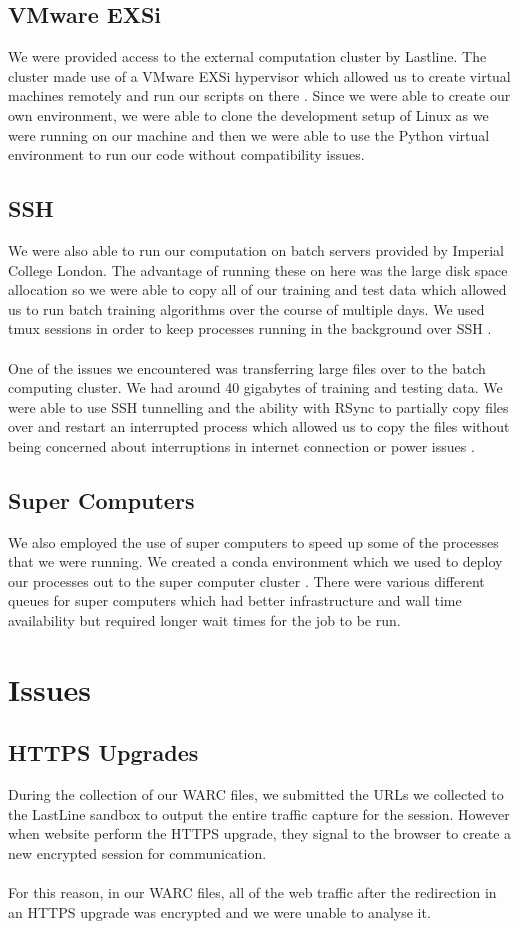 \documentclass[12pt,twoside]{report}
\begin{document}
\subsection{VMware EXSi}
We were provided access to the external computation cluster by Lastline. The cluster made use of a VMware EXSi hypervisor which allowed us to create virtual machines remotely and run our scripts on there \cite{vmwareexsi}. Since we were able to create our own environment, we were able to clone the development setup of Linux as we were running on our machine and then we were able to use the Python virtual environment to run our code without compatibility issues.
\subsection{SSH}
We were also able to run our computation on batch servers provided by Imperial College London. The advantage of running these on here was the large disk space allocation so we were able to copy all of our training and test data which allowed us to run batch training algorithms over the course of multiple days. We used tmux sessions in order to keep processes running in the background over SSH \cite{tmux}.
\\\\
One of the issues we encountered was transferring large files over to the batch computing cluster. We had around 40 gigabytes of training and testing data. We were able to use SSH tunnelling and the ability with RSync to partially copy files over and restart an interrupted process which allowed us to copy the files without being concerned about interruptions in internet connection or power issues \cite{rsync}.
\subsection{Super Computers}
We also employed the use of super computers to speed up some of the processes that we were running. We created a conda environment which we used to deploy our processes out to the super computer cluster \cite{conda}. There were various different queues for super computers which had better infrastructure and wall time availability but required longer wait times for the job to be run.
\section{Issues}
\subsection{HTTPS Upgrades}
During the collection of our WARC files, we submitted the URLs we collected to the LastLine sandbox to output the entire traffic capture for the session. However when website perform the HTTPS upgrade, they signal to the browser to create a new encrypted session for communication.
\\\\
For this reason, in our WARC files, all of the web traffic after the redirection in an HTTPS upgrade was encrypted and we were unable to analyse it.
\end{document}
